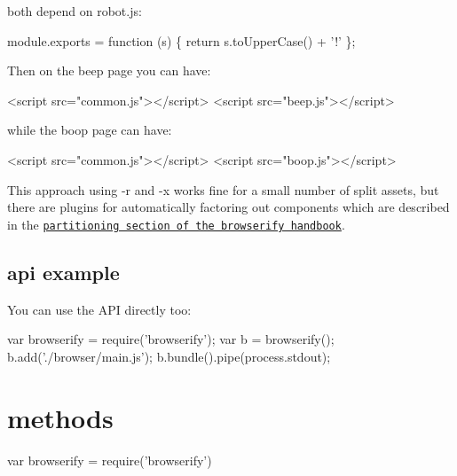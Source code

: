 both depend on {\ttfamily robot.\+js}\+:


\begin{DoxyCode}
module.exports = function (s) \{ return s.toUpperCase() + '!' \};
\end{DoxyCode}





Then on the beep page you can have\+:


\begin{DoxyCode}
<script src="common.js"></script>
<script src="beep.js"></script>
\end{DoxyCode}


while the boop page can have\+:


\begin{DoxyCode}
<script src="common.js"></script>
<script src="boop.js"></script>
\end{DoxyCode}


This approach using {\ttfamily -\/r} and {\ttfamily -\/x} works fine for a small number of split assets, but there are plugins for automatically factoring out components which are described in the \href{https://github.com/browserify/browserify-handbook#partitioning}{\tt partitioning section of the browserify handbook}.

\subsection*{api example}

You can use the A\+PI directly too\+:


\begin{DoxyCode}
var browserify = require('browserify');
var b = browserify();
b.add('./browser/main.js');
b.bundle().pipe(process.stdout);
\end{DoxyCode}


\section*{methods}


\begin{DoxyCode}
var browserify = require('browserify')
\end{DoxyCode}



